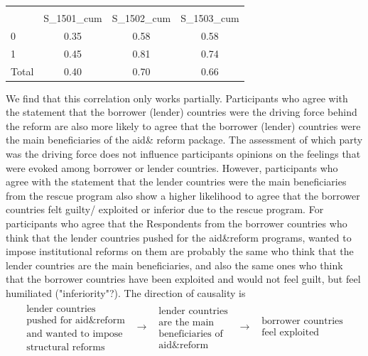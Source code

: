 \begin{table}[h!]
   \centering
\begin{tabular}{l*{1}{ccc}}
\hline\hline
                    &\multicolumn{3}{c}{}                  \\
                    &  S\_1501\_cum&  S\_1502\_cum&  S\_1503\_cum\\
\hline
0                   &        0.35&        0.58&        0.58\\
1                   &        0.45&        0.81&        0.74\\
Total               &        0.40&        0.70&        0.66\\
\hline\hline
\end{tabular}

\end{table}
We find that this correlation only works partially. Participants who agree with the statement that the borrower (lender) countries were the driving force behind the reform are also more likely to agree that the borrower (lender) countries were the main beneficiaries of the aid& reform package. The assessment of which party was the driving force does not influence participants opinions on the feelings that were evoked among borrower or lender countries. However, participants who agree with the statement that the lender countries were the main beneficiaries from the rescue program also show a higher likelihood to agree that the borrower countries felt guilty/ exploited or inferior due to the rescue program. For participants who agree that the 
Respondents from the borrower countries who think that the lender countries
pushed for the aid\&reform programs, wanted to impose institutional reforms
on them are probably the same who think that the lender countries are the
main beneficiaries, and also the same ones who think that the borrower
countries have been exploited and would not feel guilt, but feel humiliated
("inferiority"?). The direction of causality is%
\begin{equation*}
\begin{array}{ccccc}
\begin{array}{c}
\text{lender countries} \\ 
\text{pushed for aid\&reform} \\ 
\text{and wanted to impose} \\ 
\text{structural reforms}%
\end{array}
& \rightarrow  & 
\begin{array}{c}
\text{lender countries} \\ 
\text{are the main} \\ 
\text{beneficiaries of} \\ 
\text{aid\&reform}%
\end{array}
& \rightarrow  & 
\begin{array}{c}
\text{borrower countries} \\ 
\text{feel exploited}%
\end{array}%
\end{array}%
\end{equation*}
